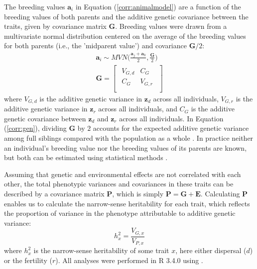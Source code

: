 The breeding values $\bm{a}_{i}$ in Equation (\ref{corr:animalmodel}) are a function of the breeding values of both parents and the additive genetic covariance between the traits, given by covariance matrix $\bm{G}$. Breeding values were drawn from a multivariate normal distribution centered on the average of the breeding values for both parents (i.e., the 'midparent value') and covariance $\bm{G}/2$:
%
\begin{gather} \label{corr:gen}
  \bm{a}_{i} \sim \mathit{MVN} \Big( \frac{\bm{a}_{j} + \bm{a}_{k}}{2}, \frac{\bm{G}}{2} \Big) \\[10pt]
  \bm{G} =
  \begin{bmatrix}
    \begin{array}{ll}
      V_{G,d} &C_{G}   \\
      C_{G}   &V_{G,r} \\
    \end{array}
  \end{bmatrix}
\end{gather}
%
where $V_{G,d}$ is the additive genetic variance in $\bm{z}_{d}$ across all individuals, $V_{G,r}$ is the additive genetic variance in $\bm{z}_{r}$ across all individuals, and $C_{G}$ is the additive genetic covariance between $\bm{z}_{d}$ and $\bm{z}_{r}$ across all individuals. In Equation (\ref{corr:gen}), dividing $\bm{G}$ by $2$ accounts for the expected additive genetic variance among full siblings compared with the population as a whole \citep{roughgarden_theory_1979} . In practice neither an individual's breeding value nor the breeding values of its parents are known, but both can be estimated using statistical methods \citep{wilson_ecologists_2010} .

Assuming that genetic and environmental effects are not correlated with each other, the total phenotypic variances and covariances in these traits can be described by a covariance matrix $\bm{P}$, which is simply $\bm{P} = \bm{G} + \bm{E}$. Calculating $\bm{P}$ enables us to calculate the narrow-sense heritability for each trait, which reflects the proportion of variance in the phenotype attributable to additive genetic variance:
%
\begin{equation}\label{corr:heritability}
  h^{2}_x = \frac{V_{G,x}}{V_{P,x}}
\end{equation}
%
where $h^{2}_x$ is the narrow-sense heritability of some trait $x$, here either dispersal ($d$) or the fertility ($r$). All analyses were performed in R 3.4.0 \citep{r_core_team_r:_2015} using  \citep{stan_development_team_rstan:_2015}.

